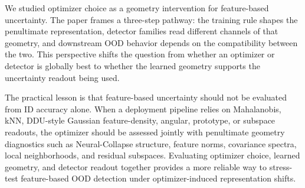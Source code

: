 We studied optimizer choice as a geometry intervention for feature-based
uncertainty. The paper frames a three-step pathway: the training rule shapes the
penultimate representation, detector families read different channels of that
geometry, and downstream OOD behavior depends on the compatibility between the
two. This perspective shifts the question from whether an optimizer or detector
is globally best to whether the learned geometry supports the uncertainty
readout being used.

The practical lesson is that feature-based uncertainty should not be evaluated
from ID accuracy alone. When a deployment pipeline relies on Mahalanobis, kNN,
DDU-style Gaussian feature-density, angular, prototype, or subspace readouts, the
optimizer should be assessed jointly with penultimate geometry diagnostics such
as Neural-Collapse structure, feature norms, covariance spectra, local
neighborhoods, and residual subspaces. Evaluating optimizer choice, learned
geometry, and detector readout together provides a more reliable way to
stress-test feature-based OOD detection under optimizer-induced representation
shifts.
